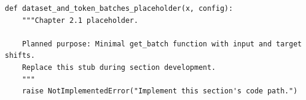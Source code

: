 \begin{lstlisting}[style=bookpython,caption={Planned code placeholder for dataset and token batches.},label={lst:ch02-dataset-and-token-batches}]
def dataset_and_token_batches_placeholder(x, config):
    """Chapter 2.1 placeholder.

    Planned purpose: Minimal get_batch function with input and target shifts.
    Replace this stub during section development.
    """
    raise NotImplementedError("Implement this section's code path.")
\end{lstlisting}
